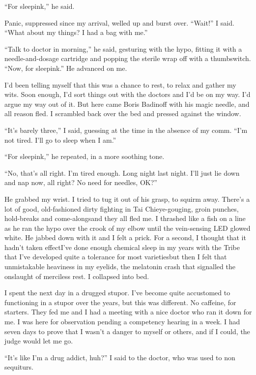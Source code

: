 “For sleepink,” he said.

Panic, suppressed since my arrival, welled up and burst over.
“Wait!” I said. “What about my things? I had a bag with me.”

“Talk to doctor in morning,” he said, gesturing with the hypo,
fitting it with a needle-and-dosage cartridge and popping the
sterile wrap off with a thumbswitch. “Now, for sleepink.” He
advanced on me.

I’d been telling myself that this was a chance to rest, to relax
and gather my wits. Soon enough, I’d sort things out with the
doctors and I’d be on my way. I’d argue my way out of it. But here
came Boris Badinoff with his magic needle, and all reason fled. I
scrambled back over the bed and pressed against the window.

“It’s barely three,” I said, guessing at the time in the absence of
my comm. “I’m not tired. I’ll go to sleep when I am.”

“For sleepink,” he repeated, in a more soothing tone.

“No, that’s all right. I’m tired enough. Long night last night.
I’ll just lie down and nap now, all right? No need for needles,
OK?”

He grabbed my wrist. I tried to tug it out of his grasp, to squirm
away. There’s a lot of good, old-fashioned dirty fighting in Tai
Chi{\dash}eye-gouging, groin punches, hold-breaks and come-alongs{\dash}and
they all fled me. I thrashed like a fish on a line as he ran the
hypo over the crook of my elbow until the vein-sensing LED glowed
white. He jabbed down with it and I felt a prick. For a second, I
thought that it hadn’t taken effect{\dash}I’ve done enough chemical sleep
in my years with the Tribe that I’ve developed quite a tolerance
for most varieties{\dash}but then I felt that unmistakable heaviness in
my eyelids, the melatonin crash that signalled the onslaught of
merciless rest. I collapsed into bed.

I spent the next day in a drugged stupor. I’ve become quite
accustomed to functioning in a stupor over the years, but this was
different. No caffeine, for starters. They fed me and I had a
meeting with a nice doctor who ran it down for me. I was here for
observation pending a competency hearing in a week. I had seven
days to prove that I wasn’t a danger to myself or others, and if I
could, the judge would let me go.

“It’s like I’m a drug addict, huh?” I said to the doctor, who was
used to non sequiturs.

